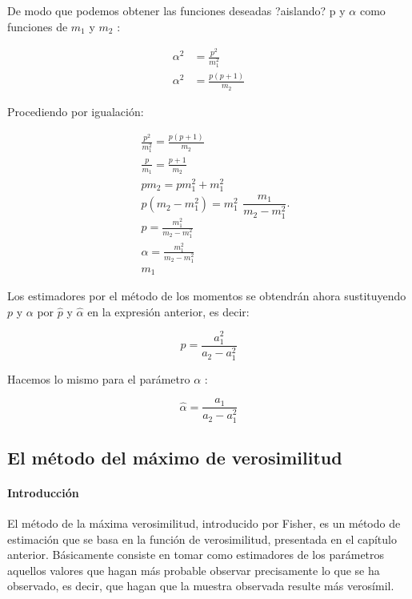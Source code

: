 \documentclass[
]{article}
\begin{document}
De modo que podemos obtener las funciones deseadas ?aislando? p y \(\alpha\) como funciones de \(m_{1}\) y \(m_{2}\) :

\[
\begin{aligned}
\alpha^{2} & =\frac{p^{2}}{m_{1}^{2}} \\
\alpha^{2} & =\frac{p(p+1)}{m_{2}}
\end{aligned}
\]

Procediendo por igualación:

\[
\begin{aligned}
& \frac{p^{2}}{m_{1}^{2}}=\frac{p(p+1)}{m_{2}} \\
& \frac{p}{m_{1}}=\frac{p+1}{m_{2}} \\
& p m_{2}=p m_{1}^{2}+m_{1}^{2} \\
& p\left(m_{2}-m_{1}^{2}\right)=m_{1}^{2} \\
& p=\frac{m_{1}^{2}}{m_{2}-m_{1}^{2}} \\
& \alpha=\frac{m_{1}^{2}}{m_{2}-m_{1}^{2}} \\
& m_{1}
\end{aligned} \frac{m_{1}}{m_{2}-m_{1}^{2}} .
\]

Los estimadores por el método de los momentos se obtendrán ahora sustituyendo \(p\) y \(\alpha\) por \(\hat{p}\) y \(\hat{\alpha}\) en la expresión anterior, es decir:

\[
\widehat{p}=\frac{a_{1}^{2}}{a_{2}-a_{1}^{2}}
\]

Hacemos lo mismo para el parámetro \(\alpha\) :

\[
\widehat{\alpha}=\frac{a_{1}}{a_{2}-a_{1}^{2}}
\]

\subsection{El método del máximo de verosimilitud}\label{el-muxe9todo-del-muxe1ximo-de-verosimilitud}

\paragraph{Introducción}\label{introducciuxf3n-1}

El método de la máxima verosimilitud, introducido por Fisher, es un método de estimación que se basa en la función de verosimilitud, presentada en el capítulo anterior. Básicamente consiste en tomar como estimadores de los parámetros aquellos valores que hagan más probable observar precisamente lo que se ha observado, es decir, que hagan que la muestra observada resulte más verosímil.
\end{document}
